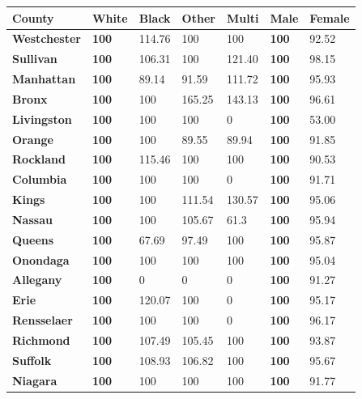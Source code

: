 \documentclass[10pt,twocolumn,letterpaper]{article}
\begin{document}
\begin{table}[htb!]
\small
\begin{center}
\begin{tabular}{|l|l|l|l|l|l|l|}
\hline
\textbf{County} & \textbf{White} & \textbf{Black} & \textbf{Other} & \textbf{Multi} & \textbf{Male} & \textbf{Female} \\ \hline
\textbf{Westchester} & \textbf{100} & 114.76 & 100 & 100 & \textbf{100} & 92.52 \\ \hline
\textbf{Sullivan} & \textbf{100} & 106.31 & 100 & 121.40 & \textbf{100} & 98.15 \\ \hline
\textbf{Manhattan} & \textbf{100} & 89.14 & 91.59 & 111.72 & \textbf{100} & 95.93 \\ \hline
\textbf{Bronx} & \textbf{100} & 100 & 165.25 & 143.13 & \textbf{100} & 96.61 \\ \hline
\textbf{Livingston} & \textbf{100} & 100 & 100 & 0 & \textbf{100} & 53.00 \\ \hline
\textbf{Orange} & \textbf{100} & 100 & 89.55 & 89.94 & \textbf{100} & 91.85 \\ \hline
\textbf{Rockland} & \textbf{100} & 115.46 & 100 & 100 & \textbf{100} & 90.53 \\ \hline
\textbf{Columbia} & \textbf{100} & 100 & 100 & 0 & \textbf{100} & 91.71 \\ \hline
\textbf{Kings} & \textbf{100} & 100 & 111.54 & 130.57 & \textbf{100} & 95.06 \\ \hline
\textbf{Nassau} & \textbf{100} & 100 & 105.67 & 61.3 & \textbf{100} & 95.94 \\ \hline
\textbf{Queens} & \textbf{100} & 67.69 & 97.49 & 100 & \textbf{100} & 95.87 \\ \hline
\textbf{Onondaga} & \textbf{100} & 100 & 100 & 100 & \textbf{100} & 95.04 \\ \hline
\textbf{Allegany} & \textbf{100} & 0 & 0 & 0 & \textbf{100} & 91.27 \\ \hline
\textbf{Erie} & \textbf{100} & 120.07 & 100 & 0 & \textbf{100} & 95.17 \\ \hline
\textbf{Rensselaer} & \textbf{100} & 100 & 100 & 0 & \textbf{100} & 96.17 \\ \hline
\textbf{Richmond} & \textbf{100} & 107.49 & 105.45 & 100 & \textbf{100} & 93.87 \\ \hline
\textbf{Suffolk} & \textbf{100} & 108.93 & 106.82 & 100 & \textbf{100} & 95.67 \\ \hline
\textbf{Niagara} & \textbf{100} & 100 & 100 & 100 & \textbf{100} & 91.77 \\ \hline

\end{tabular}
\end{center}
\end{table}
\end{document}
